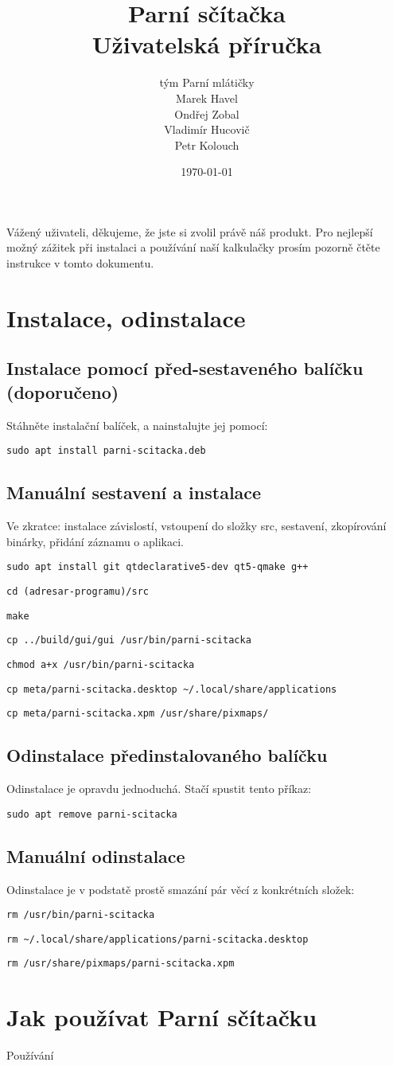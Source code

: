 \documentclass[a4paper]{article}
\title{\Huge Parní sčítačka\\\huge Uživatelská příručka}
\author{\LARGE tým Parní mlátičky \\ Marek Havel \\ Ondřej Zobal\\ Vladimír Hucovič\\ Petr Kolouch}
\date{\today}
\begin{document}
\maketitle

Vážený uživateli, děkujeme, že jste si zvolil právě náš produkt. Pro nejlepší možný zážitek při instalaci a používání naší kalkulačky prosím pozorně čtěte instrukce v tomto dokumentu.

\section*{Instalace, odinstalace}

\subsection*{Instalace pomocí před-sestaveného balíčku (doporučeno)}

Stáhněte instalační balíček, a nainstalujte jej pomocí:

\verb|sudo apt install parni-scitacka.deb|

\subsection*{Manuální sestavení a instalace}

Ve zkratce: instalace závislostí, vstoupení do složky src, sestavení, zkopírování binárky, přidání záznamu o aplikaci.

\verb|sudo apt install git qtdeclarative5-dev qt5-qmake g++|

\verb|cd (adresar-programu)/src|

\verb|make|

\verb|cp ../build/gui/gui /usr/bin/parni-scitacka|

\verb|chmod a+x /usr/bin/parni-scitacka|

\verb|cp meta/parni-scitacka.desktop ~/.local/share/applications|

\verb|cp meta/parni-scitacka.xpm /usr/share/pixmaps/|

\subsection*{Odinstalace předinstalovaného balíčku}

Odinstalace je opravdu jednoduchá. Stačí spustit tento příkaz:

\verb|sudo apt remove parni-scitacka|

\subsection*{Manuální odinstalace}

Odinstalace je v podstatě prostě smazání pár věcí z konkrétních složek:

\verb|rm /usr/bin/parni-scitacka|

\verb|rm ~/.local/share/applications/parni-scitacka.desktop|

\verb|rm /usr/share/pixmaps/parni-scitacka.xpm|

\pagebreak
\section*{Jak používat Parní sčítačku}

Používání
\end{document}
